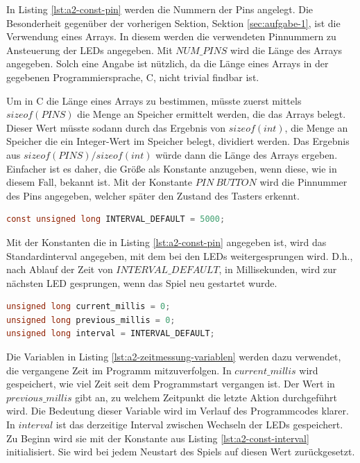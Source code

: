 In Listing \ref{lst:a2-const-pin} werden die Nummern der Pins angelegt.
Die Besonderheit gegenüber der vorherigen Sektion, Sektion \ref{sec:aufgabe-1}, ist die Verwendung eines Arrays.
In diesem werden die verwendeten Pinnummern zu Ansteuerung der LEDs angegeben.
Mit $NUM\_PINS$ wird die Länge des Arrays angegeben.
Solch eine Angabe ist nützlich, da die Länge eines Arrays in der gegebenen Programmiersprache, C, nicht trivial findbar ist.

Um in C die Länge eines Arrays zu bestimmen, müsste zuerst mittels $sizeof(PINS)$ die Menge an Speicher ermittelt werden, die das Arrays belegt.
Dieser Wert müsste sodann durch das Ergebnis von $sizeof(int)$, die Menge an Speicher die ein Integer-Wert im Speicher belegt, dividiert werden.
Das Ergebnis aus $sizeof(PINS) / sizeof(int)$ würde dann die Länge des Arrays ergeben.
Einfacher ist es daher, die Größe als Konstante anzugeben, wenn diese, wie in diesem Fall, bekannt ist.
Mit der Konstante $PIN\:BUTTON$ wird die Pinnummer des Pins angegeben, welcher später den Zustand des Tasters erkennt.

\begin{lstlisting}[language=C,label={lst:a2-const-interval}, caption={Standard Interval zum LED wechsel}]
const unsigned long INTERVAL_DEFAULT = 5000;
\end{lstlisting}

Mit der Konstanten die in Listing \ref{lst:a2-const-pin} angegeben ist, wird das Standardinterval angegeben, mit dem bei den LEDs weitergesprungen wird.
D.h., nach Ablauf der Zeit von $INTERVAL\_DEFAULT$, in Millisekunden, wird zur nächsten LED gesprungen, wenn das Spiel neu gestartet wurde.


\begin{lstlisting}[language=C,label={lst:a2-zeitmessung-variablen}, caption={Variablen zur Zeitmessung}]
unsigned long current_millis = 0;
unsigned long previous_millis = 0;
unsigned long interval = INTERVAL_DEFAULT;
\end{lstlisting}

Die Variablen in Listing \ref{lst:a2-zeitmessung-variablen} werden dazu verwendet, die vergangene Zeit im Programm mitzuverfolgen.
In $current\_millis$ wird gespeichert, wie viel Zeit seit dem Programmstart vergangen ist.
Der Wert in $previous\_millis$ gibt an, zu welchem Zeitpunkt die letzte Aktion durchgeführt wird.
Die Bedeutung dieser Variable wird im Verlauf des Programmcodes klarer.
In $interval$ ist das derzeitige Interval zwischen Wechseln der LEDs gespeichert.
Zu Beginn wird sie mit der Konstante aus Listing \ref{lst:a2-const-interval} initialisiert.
Sie wird bei jedem Neustart des Spiels auf diesen Wert zurückgesetzt.


